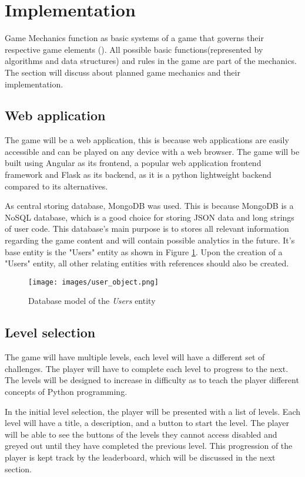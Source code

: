 \section{Implementation}
Game Mechanics function as basic systems of a game that governs their respective game elements (\cite{adams2012game}). All possible basic functions(represented by algorithms and data structures) and rules in the game are part of the mechanics. The section will discuss about planned game mechanics and their implementation.

\subsection{Web application}
The game will be a web application, this is because web applications are easily accessible and can be played on any device with a web browser. The game will be built using Angular as its frontend, a popular web application frontend framework and Flask as its backend, as it is a python lightweight backend compared to its alternatives.

As central storing database, MongoDB was used. This is because MongoDB is a NoSQL database, which is a good choice for storing JSON data and long strings of user code. This database's main purpose is to stores all relevant information regarding the game content and will contain possible analytics in the future. It's base entity is the "Users" entity as shown in Figure \ref{fig:users}. Upon the creation of a "Users" entity, all other relating entities with references should also be created.
\begin{figure}[h]
    \centering
    \texttt{[image: images/user\_object.png]}
    \caption{Database model of the \textit{Users} entity}    
    \label{fig:users}
\end{figure}

\subsection{Level selection}
The game will have multiple levels, each level will have a different set of challenges. The player will have to complete each level to progress to the next. The levels will be designed to increase in difficulty as to teach the player different concepts of Python programming.

In the initial level selection, the player will be presented with a list of levels. Each level will have a title, a description, and a button to start the level. The player will be able to see the buttons of the levels they cannot access disabled and greyed out until they have completed the previous level. This progression of the player is kept track by the leaderboard, which will be discussed in the next section.


